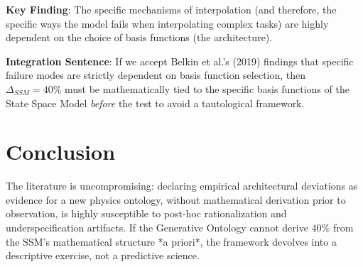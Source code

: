 \documentclass{article}
\begin{document}
\textbf{Key Finding}: The specific mechanisms of interpolation (and therefore, the specific ways the model fails when interpolating complex tasks) are highly dependent on the choice of basis functions (the architecture).

\textbf{Integration Sentence}: If we accept Belkin et al.'s (2019) findings that specific failure modes are strictly dependent on basis function selection, then $\Delta_{SSM} = 40\%$ must be mathematically tied to the specific basis functions of the State Space Model \textit{before} the test to avoid a tautological framework.

\section{Conclusion}
The literature is uncompromising: declaring empirical architectural deviations as evidence for a new physics ontology, without mathematical derivation prior to observation, is highly susceptible to post-hoc rationalization and underspecification artifacts. If the Generative Ontology cannot derive $40\%$ from the SSM's mathematical structure *a priori*, the framework devolves into a descriptive exercise, not a predictive science.
\end{document}

